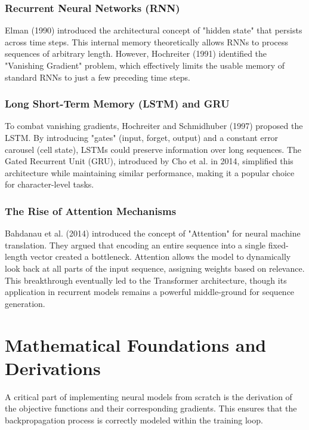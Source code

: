 \documentclass[12pt,a4paper]{article}
\begin{document}
\subsubsection{Recurrent Neural Networks (RNN)}
Elman (1990) introduced the architectural concept of "hidden state" that persists across time steps. This internal memory theoretically allows RNNs to process sequences of arbitrary length. However, Hochreiter (1991) identified the "Vanishing Gradient" problem, which effectively limits the usable memory of standard RNNs to just a few preceding time steps.

\subsubsection{Long Short-Term Memory (LSTM) and GRU}
To combat vanishing gradients, Hochreiter and Schmidhuber (1997) proposed the LSTM. By introducing "gates" (input, forget, output) and a constant error carousel (cell state), LSTMs could preserve information over long sequences. The Gated Recurrent Unit (GRU), introduced by Cho et al. in 2014, simplified this architecture while maintaining similar performance, making it a popular choice for character-level tasks.

\subsubsection{The Rise of Attention Mechanisms}
Bahdanau et al. (2014) introduced the concept of "Attention" for neural machine translation. They argued that encoding an entire sequence into a single fixed-length vector created a bottleneck. Attention allows the model to dynamically look back at all parts of the input sequence, assigning weights based on relevance. This breakthrough eventually led to the Transformer architecture, though its application in recurrent models remains a powerful middle-ground for sequence generation.

\newpage

\section{Mathematical Foundations and Derivations}
A critical part of implementing neural models from scratch is the derivation of the objective functions and their corresponding gradients. This ensures that the backpropagation process is correctly modeled within the training loop.
\end{document}
